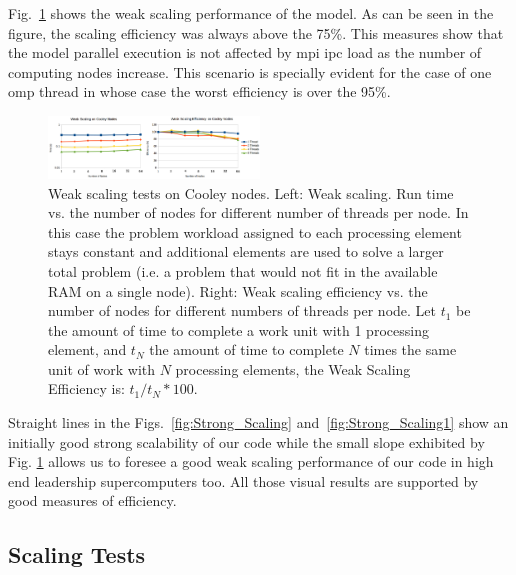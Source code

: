 \documentclass[10pt,journal,compsoc]{IEEEtran}
\begin{document}
Fig.~\ref{fig:Weak_Scaling} shows the weak scaling performance of the model. As can be seen in the figure, the scaling efficiency was always above the 75\%. This measures show that the model parallel execution is not affected by \gls{mpi} \gls{ipc} load as the number of computing nodes increase. This scenario is specially evident for the case of one \gls{omp} thread in whose case the worst efficiency is over the 95\%.


\begin{figure}[h!]
    \centering
    \includegraphics[width=0.5\textwidth]{Weak_Scaling.png}
    \caption{Weak scaling tests on Cooley nodes. Left: Weak scaling. Run time vs. the number of nodes for different number of threads per node. In this case the problem workload assigned to each processing element stays constant and additional elements are used to solve a larger total problem (i.e. a problem that would not fit in the available RAM on a single node). Right: Weak scaling efficiency vs. the number of nodes for different numbers of threads per node. Let $t_1$ be the amount of time to complete a work unit with 1 processing element, and $t_N$ the amount of time to complete $N$ times the same unit of work with $N$ processing elements, the Weak Scaling Efficiency is: $t_1 / t_N * 100$.}
    \label{fig:Weak_Scaling}
\end{figure}

Straight lines in the Figs.~\ref{fig:Strong_Scaling} and~\ref{fig:Strong_Scaling1} show an initially good strong scalability of our code while the small slope exhibited by Fig. \ref{fig:Weak_Scaling} allows us to foresee a good weak scaling performance of our code in high end leadership supercomputers too. All those visual results are supported by good measures of efficiency.
















\subsection{ Scaling Tests}
\end{document}
